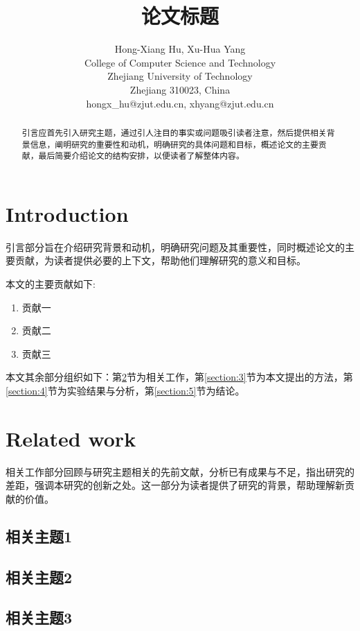 \documentclass{article}
\title{论文标题}
\author{
  Hong-Xiang Hu, Xu-Hua Yang \\
  College of Computer Science and Technology \\
  Zhejiang University of Technology \\
  Zhejiang 310023, China\\
  hongx\_hu@zjut.edu.cn, xhyang@zjut.edu.cn \\
}
\begin{document}
\maketitle


\begin{abstract}
引言应首先引入研究主题，通过引人注目的事实或问题吸引读者注意，然后提供相关背景信息，阐明研究的重要性和动机，明确研究的具体问题和目标，概述论文的主要贡献，最后简要介绍论文的结构安排，以便读者了解整体内容。
\end{abstract}



\section{Introduction}
\label{section:1}
引言部分旨在介绍研究背景和动机，明确研究问题及其重要性，同时概述论文的主要贡献，为读者提供必要的上下文，帮助他们理解研究的意义和目标。

本文的主要贡献如下:
\begin{enumerate}[(1)]
\itemsep=0pt
\item 贡献一
\item 贡献二
\item 贡献三
\end{enumerate}

\indent 本文其余部分组织如下：第\ref{section:2}节为相关工作，第\ref{section:3}节为本文提出的方法，第\ref{section:4}节为实验结果与分析，第\ref{section:5}节为结论。



\section{Related work}
\label{section:2}
相关工作部分回顾与研究主题相关的先前文献，分析已有成果与不足，指出研究的差距，强调本研究的创新之处。这一部分为读者提供了研究的背景，帮助理解新贡献的价值。

\subsection{相关主题1}

\subsection{相关主题2}

\subsection{相关主题3}
\end{document}
